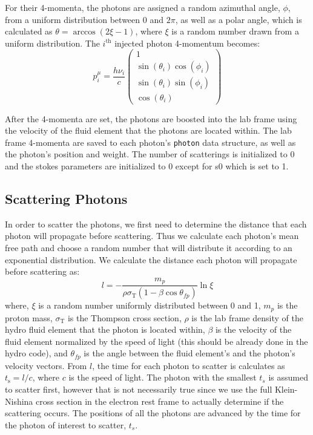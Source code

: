 \documentclass[12pt,a4paper]{article}
\begin{document}
For their 4-momenta, the photons are assigned a random azimuthal angle, $\phi$, from a uniform distribution between $0$ and $2\pi$, as well as a polar angle, which is calculated as $\theta=\arccos(2\xi-1)$, where $\xi$ is a random number drawn from a uniform distribution. The $i^\mathrm{th}$ injected photon 4-momentum becomes:
\[
p^\mu_i=\frac{h\nu_i}{c}\begin{pmatrix}
1 \\ \sin(\theta_i) \cos(\phi_i) \\ \sin(\theta_i) \sin(\phi_i) \\ \cos(\theta_i)
\end{pmatrix}
\]

After the 4-momenta are set, the photons are boosted into the lab frame using the velocity of the fluid element that the photons are located within. The lab frame 4-momenta are saved to each photon's \texttt{photon} data structure, as well as the photon's position and weight. The number of scatterings is initialized to 0 and the stokes parameters are initialized to 0 except for s0 which is set to 1.




\subsection{Scattering Photons} \label{scatt}

In order to scatter the photons, we first need to determine the distance that each photon will propagate before scattering. Thus we calculate each photon's mean free path and choose a random number that will distribute it according to an exponential distribution. We calculate the distance each photon will propagate before scattering as:
\[
l=-\frac{m_p}{\rho\sigma_\mathrm{T}(1-\beta\cos\theta_{fp})}\ln\xi
\]
where, $\xi$ is a random number uniformly distributed between 0 and 1, $m_p$ is the proton mass, $\sigma_\mathrm{T}$ is the Thompson cross section, $\rho$ is the lab frame density of the hydro fluid element that the photon is located within, $\beta$ is the velocity of the fluid element normalized by the speed of light (this should be already done in the hydro code), and $\theta_{fp}$ is the angle between the fluid element's and the photon's velocity vectors. From $l$, the time for each photon to scatter is calculates as $t_\mathrm{s}=l/c$, where $c$ is the speed of light. The photon with the smallest $t_s$ is assumed to scatter first, however that is not necessarily true since we use the full Klein-Nishina cross section in the electron rest frame to actually determine if the scattering occurs. The positions of all the photons are advanced by the time for the photon of interest to scatter, $t_s$.
\end{document}
